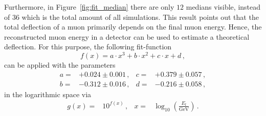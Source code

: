 Furthermore, in Figure~\ref{fig:fit_median} there are only $12$ medians visible, 
instead of $36$ which is the total amount of all simulations. This result points 
out that the total deflection of a muon 
primarily depends on the final muon energy. Hence, the reconstructed muon 
energy in a detector can be used to estimate a theoretical deflection. For this 
purpose, the following fit-function 
\begin{equation}
     f(x) = a \cdot x^3 + b \cdot x^2 + c \cdot x + d \,,
    \label{eqn:fit_median}
\end{equation}
can be applied with the parameters 
\begin{align}
    a =& +0.024 \pm 0.001\,,  & c =& +0.379 \pm 0.057\,,\\
    b =& -0.312 \pm 0.016\,,  & d =& -0.216 \pm 0.058\,,
\end{align}
in the logarithmic space via 
\begin{align}
    g(x) =& 10^{f(x)}\,, & x =& \log_{10}\left(\frac{E_{\text{f}}}{\si{\giga\electronvolt}}\right)\,.
\end{align}



